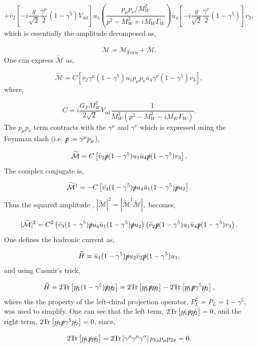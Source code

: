 \documentclass[a4paper,11pt]{article}
\begin{document}
$$
+  \bar{v}_2\left[-i\frac{g}{\sqrt{2}}\frac{\gamma^\mu}{2}(1-\gamma^5)V_\text{ud}\right]u_1\left(\frac{p_\mu p_\nu/M_W^2}{p^2 - M_W^2+ iM_W\Gamma_W}\right)\bar{u}_4\left[-i\frac{g}{\sqrt{2}}\frac{\gamma^\nu}{2}(1-\gamma^5)\right] v_3,
$$
which is essentially the amplitude decomposed as,

$$\mathcal{M} = \mathcal{M}_\text{Feyn} + \widetilde{\mathcal{M}}.$$
One can express $\widetilde{\mathcal{M}}$ as,

$$ \widetilde{\mathcal{M}}=  C\left[\bar{v}_2 \gamma^\mu (1-\gamma^5)u_1 p_\mu p_\nu \bar{u}_4 \gamma^\nu (1-\gamma^5)v_3\right],$$
where,

$$C= i\frac{G_FM_W^2}{2\sqrt{2}}V_\text{ud}\frac{1}{M_W^2(p^2-M_W^2 - iM_W\Gamma_W)}.$$
The $p_\mu p_\nu$ term contracts with the $\gamma^\mu$ and $\gamma^\nu$ which is expressed using the Feynman slash (i.e. $\slashed{p} \coloneq \gamma^\mu p_\mu $),


$$ \widetilde{\mathcal{M}}=  C\left[\bar{v}_2 \slashed{p} (1-\gamma^5)u_1 \bar{u}_4 \slashed{p} (1-\gamma^5)v_3\right].$$
The complex conjugate is,

$$
\widetilde{\mathcal{M}}^\dagger = -C \left[\bar{v_3}(1-\gamma^5)\slashed{p}u_4\bar{u}_1(1-\gamma^5)\slashed{p}u_2\right].
$$
Thus the squared amplitude , $|\widetilde{\mathcal{M}}|^2 = |\widetilde{\mathcal{M}}^\dagger\widetilde{\mathcal{M}}|,$ becomes,

$$ |\widetilde{\mathcal{M}}|^2 = C^2 \left(\bar{v_3}(1-\gamma^5)\slashed{p}u_4\bar{u}_1(1-\gamma^5)\slashed{p}u_2  \right)\left( \bar{v}_2 \slashed{p} (1-\gamma^5)u_1 \bar{u}_4 \slashed{p} (1-\gamma^5)v_3\right).$$
One defines the hadronic current as,

$$ \widetilde{H} = \bar{u}_1(1-\gamma^5)\slashed{p}u_2\bar{v}_2 \slashed{p} (1-\gamma^5)u_1,$$
and using Casmir's trick\cite{Griffiths:2008zz},

$$ \widetilde{H} = 2\text{Tr}\left[\slashed{p_1}(1-\gamma^5)\slashed{p} \slashed{p_2}\right] = 2\text{Tr}\left[\slashed{p_1}\slashed{p}\slashed{p_2}\right] - 2\text{Tr}\left[\slashed{p_1}\slashed{p}\gamma^5\slashed{p_2}\right],$$
where the the property of the left-chiral projection operator, $P_L^2 = P_L = 1-\gamma^5$, was used to simplify.
One can see that the left term, $2\text{Tr}\left[\slashed{p_1}\slashed{p}\slashed{p_2}\right] = 0$, and the right term, $2\text{Tr}\left[\slashed{p_1}\slashed{p}\gamma^5\slashed{p_2}\right] = 0$, since,

$$2\text{Tr}\left[\slashed{p_1}\slashed{p}\slashed{p_2}\right]  = 2\text{Tr}\left[\gamma^\rho \gamma^\mu \gamma^\sigma\right] p_{1\rho}p_\mu p_{2\sigma} = 0, $$
\end{document}

